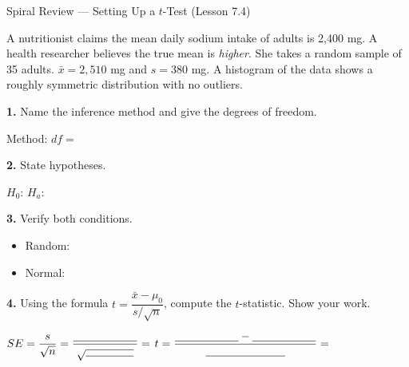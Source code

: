 \documentclass[10pt]{article}
\begin{document}
\namedateperiod

\vspace{0.15in}

\begin{notesbox}{Spiral Review --- Setting Up a $t$-Test (Lesson 7.4)}

A nutritionist claims the mean daily sodium intake of adults is 2,400 mg. A health researcher
believes the true mean is \emph{higher}. She takes a random sample of 35 adults.
$\bar x = 2{,}510$ mg and $s = 380$ mg. A histogram of the data shows a roughly symmetric
distribution with no outliers.

\textbf{1.} Name the inference method and give the degrees of freedom.

\quad Method: \blank{5cm} \quad $df = $ \blank{1.5cm}

\textbf{2.} State hypotheses.

\quad $H_0$: \blank{5cm} \quad $H_a$: \blank{5cm}

\textbf{3.} Verify both conditions.
\begin{itemize}
  \item Random: \writeline
  \item Normal: \writeline
\end{itemize}

\textbf{4.} Using the formula $t = \dfrac{\bar x - \mu_0}{s / \sqrt{n}}$, compute the
$t$-statistic. Show your work.

\vspace{0.15in}
$SE = \dfrac{s}{\sqrt{n}} = \dfrac{\blank{2cm}}{\sqrt{\blank{1.5cm}}} = $ \blank{2.5cm}
\hfill
$t = \dfrac{\blank{2cm} - \blank{2cm}}{\blank{2.5cm}} = $ \blank{2.5cm}

\end{notesbox}
\end{document}
